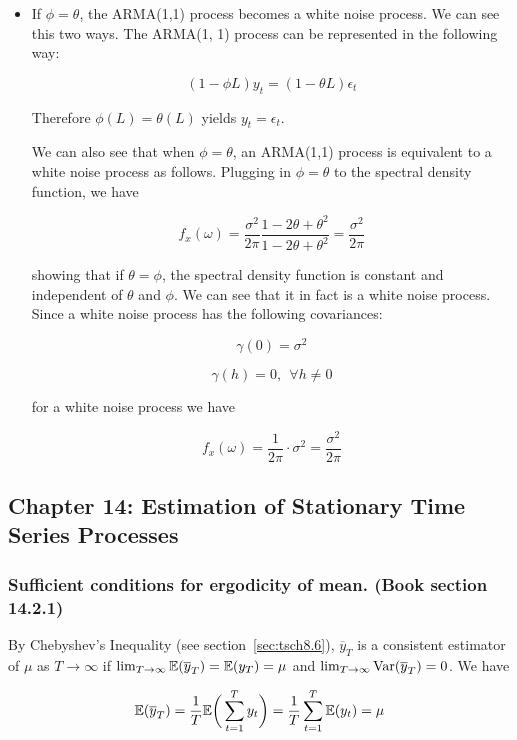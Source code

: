 \begin{itemize}
\item If \(\phi = \theta\), the ARMA(1,1) process becomes a white noise process. We can see this two ways. The ARMA(1, 1) process can be represented in the following way:

\[
(1 - \phi L)y_t = (1 - \theta L) \epsilon_t
\]

Therefore \(\phi(L) = \theta(L)\) yields \(y_t = \epsilon_t\). 


We can also see that when \(\phi = \theta\), an ARMA(1,1) process is equivalent to a white noise process as follows. Plugging in \(\phi = \theta\) to the spectral density function, we have

\[
f_x(\omega) = \frac{\sigma^2}{2\pi} \frac{1 - 2\theta + \theta^2}{1 -2\theta + \theta^2} = \frac{\sigma^2}{2\pi}
\]

showing that if \(\theta = \phi\), the spectral density function is constant and independent of \(\theta\) and \(\phi \). We can see that it in fact is a white noise process. Since a white noise process has the following covariances:

\[
\gamma(0) = \sigma^2
\]

\[
\gamma(h) =0, \ \ \forall h \neq 0
\]

for a white noise process we have

\[
f_x(\omega) = \frac{1}{2\pi} \cdot \sigma^2 = \frac{\sigma^2}{2 \pi}
\]


\end{itemize}

%
%
%
%
%
%
\subsection{Chapter 14: Estimation of Stationary Time Series Processes}

\subsubsection{Sufficient conditions for ergodicity of mean. (Book section 14.2.1)} By Chebyshev's Inequality (see section~\ref{sec:tsch8.6}), \(\overline{y}_T\) is a consistent estimator of \(\mu\) as \(T \to \infty\) if \(\lim_{T \to \infty} \mathbb{E}(\overline{y}_T) = \mathbb{E}(y_T) = \mu\) and \(\lim_{T \to \infty} \mathrm{Var}(\overline{y}_T) = 0\). We have

\[
\mathbb{E}(\overline{y}_T) = \frac{1}{T} \mathbb{E} \bigg( \sum_{t=1}^T y_t \bigg) = \frac{1}{T}  \sum_{t=1}^T \mathbb{E} (y_t) = \mu
\]

